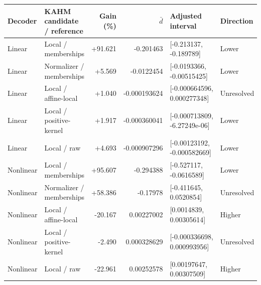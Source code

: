 \begin{tabular}{llrrll}
\toprule
Decoder & KAHM candidate / reference & Gain (\%) & $\bar d$ & Adjusted interval & Direction \\
\midrule
Linear & Local / memberships & +91.621 & -0.201463 & [-0.213137, -0.189789] & Lower \\
Linear & Normalizer / memberships & +5.569 & -0.0122454 & [-0.0193366, -0.00515425] & Lower \\
Linear & Local / affine-local & +1.040 & -0.000193624 & [-0.000664596, 0.000277348] & Unresolved \\
Linear & Local / positive-kernel & +1.917 & -0.000360041 & [-0.000713809, -6.27249e-06] & Lower \\
Linear & Local / raw & +4.693 & -0.000907296 & [-0.00123192, -0.000582669] & Lower \\
\midrule
Nonlinear & Local / memberships & +95.607 & -0.294388 & [-0.527117, -0.0616589] & Lower \\
Nonlinear & Normalizer / memberships & +58.386 & -0.17978 & [-0.411645, 0.0520854] & Unresolved \\
Nonlinear & Local / affine-local & -20.167 & 0.00227002 & [0.0014839, 0.00305614] & Higher \\
Nonlinear & Local / positive-kernel & -2.490 & 0.000328629 & [-0.000336698, 0.000993956] & Unresolved \\
Nonlinear & Local / raw & -22.961 & 0.00252578 & [0.00197647, 0.00307509] & Higher \\
\bottomrule
\end{tabular}
